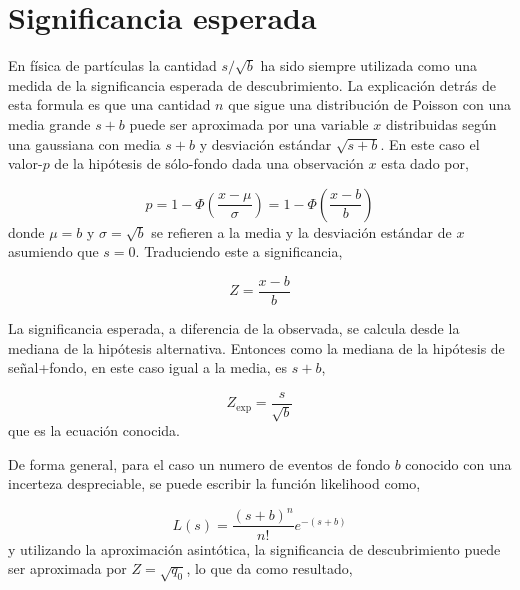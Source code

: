 \section{Significancia esperada} %


En física de partículas la cantidad $s/\sqrt{b}$ ha sido siempre utilizada como
una medida de la significancia esperada de descubrimiento. La explicación detrás
de esta formula es que una cantidad $n$ que sigue una distribución de Poisson
con una media grande $s+b$ puede ser aproximada por una variable $x$
distribuidas según una gaussiana con media $s+b$ y desviación estándar
$\sqrt{s+b}$. En este caso el valor-$p$ de la hipótesis de sólo-fondo dada una
observación $x$ esta dado por,

\begin{equation}
  p = 1 - \Phi \left( \frac{x-\mu}{\sigma} \right) = 1 - \Phi \left(
  \frac{x-b}{b} \right)
\end{equation}
%
donde $\mu=b$ y $\sigma = \sqrt{b}$ se refieren a la media y la desviación
estándar de $x$ asumiendo que $s=0$. Traduciendo este {\pvalue} a significancia,

\begin{equation}
  Z = \frac{x-b}{b}
\end{equation}

La significancia esperada, a diferencia de la observada, se calcula desde la mediana
de la hipótesis alternativa. Entonces como la mediana de la hipótesis de señal+fondo,
en este caso igual a la media, es $s+b$,

\begin{equation}
  Z_\text{exp} = \frac{s}{\sqrt{b}}
  \label{eq:Zsimple}
\end{equation}
%
que es la ecuación conocida. %

De forma general, para el caso un numero de eventos de fondo $b$ conocido con
una incerteza despreciable, se puede escribir la función likelihood como,

\begin{equation}
  L(s) = \frac{(s+b)^n}{n!} e^{-(s+b)}
\end{equation}
%
y utilizando la aproximación asintótica, la significancia de descubrimiento
puede ser aproximada por $Z=\sqrt{q_0}$, lo que da como resultado,

